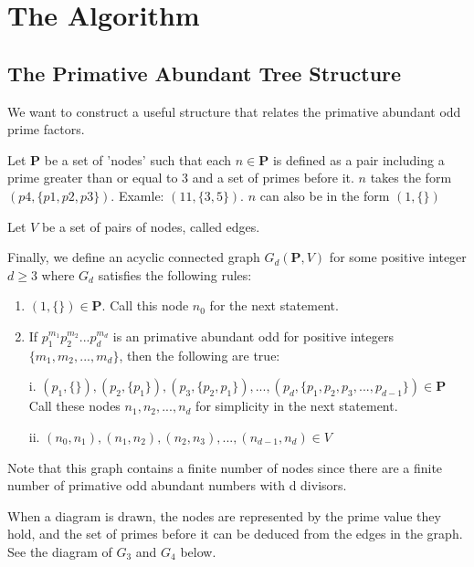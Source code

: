 \documentclass[../paper.tex]{subfiles}
\begin{document}
\section{The Algorithm}

\subsection{The Primative Abundant Tree Structure}

We want to construct a useful structure that relates the primative
abundant odd prime factors. 

Let $\mathbf{P}$ be a set of 'nodes' such that each $n \in 
\mathbf{P}$ is defined as a pair including a prime greater 
than or equal to 3 and a set of primes before it. $n$ takes the 
form $(p4, \{p1, p2, p3\})$. Examle: $(11, \{3, 5\})$.
$n$ can also be in the form $(1, \{\})$

Let $V$ be a set of pairs of nodes, called edges.

Finally, we define an acyclic connected graph $G_d(\mathbf{P},V)$ 
for some positive integer $d \geq 3$ where $G_d$ satisfies the 
following rules: 

\begin{enumerate}

\item $(1, \{\}) \in \mathbf{P}$. Call this node $n_0$ for the next 
      statement.

\item If $p_1^{m_1}p_2^{m_2}...p_d^{m_d}$ is an primative abundant 
      odd for positive integers $\{m_1, m_2, ..., m_d\}$, then
			the following are true: 

      i. $ (p_1, \{\}), (p_2, \{p_1\}), (p_3, \{p_2, p_1\}), ..., 
        (p_d, \{p_1, p_2, p_3, ..., p_{d-1}\}) \in \mathbf{P} $
			Call these nodes $n_1, n_2, ..., n_d$ for simplicity in the 
			next statement.

      ii. $ (n_0, n_1), (n_1, n_2), (n_2, n_3), ..., (n_{d-1}, n_{d}) 
      \in V $

\end{enumerate}

Note that this graph contains a finite number of nodes since 
there are a finite number of primative odd abundant numbers with
d divisors. 

When a diagram is drawn, the nodes are represented by the prime
value they hold, and the set of primes before it can be deduced
from the edges in the graph. See the diagram of $G_3$ and $G_4$
below.
\end{document}
